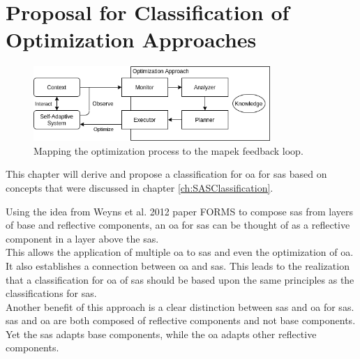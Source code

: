 \section{Proposal for Classification of Optimization Approaches}
\label{ch:Proposal}

\begin{figure}[t]
    \centering
    \includegraphics[width=0.8\textwidth]{images/ClassificationProposal-OptimizationMAPEK_horizontal.png}
    \caption{Mapping the optimization process to the \acrshort{mapek} feedback loop.}
    \label{fig:MappingOptMAPEK}
\end{figure}

This chapter will derive and propose a classification for \acrshort{oa} for \acrlong{sas}
based on concepts that were discussed in chapter \ref{ch:SASClassification}.

\noindent Using the idea from Weyns et al. 2012 paper FORMS \cite*{FORMS} to compose \acrshort{sas} from
layers of base and reflective components, 
an \acrlong{oa} for \acrshort{sas} can be thought of
as a reflective component in a layer above the \acrshort{sas}. \\
This allows the application of multiple \acrshort{oa} to \acrshort{sas} and even the 
optimization of \acrshort{oa}. \\
It also establishes a connection between \acrshort{oa} and \acrshort{sas}.
This leads to the realization that a classification for \acrshort{oa} of \acrshort{sas}
should be based upon the same principles as the classifications for \acrshort{sas}. \\
Another benefit of this approach is a clear distinction between \acrshort{sas} and \acrshort{oa} for \acrshort{sas}.
\acrshort{sas} and \acrshort{oa} are both composed of reflective components and not base components. \\
Yet the \acrshort{sas} adapts base components, while the \acrshort{oa} adapts other reflective components.

